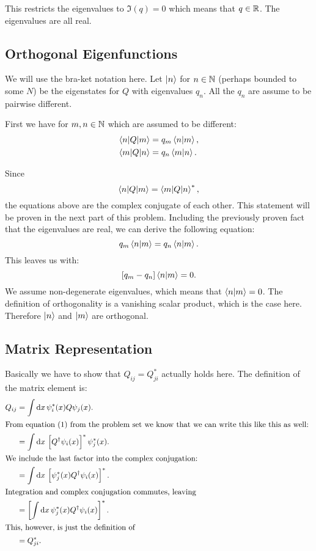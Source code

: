 \documentclass[11pt, ngerman, fleqn, DIV=15, headinclude, BCOR=1cm]{scrartcl}
\begin{document}
This restricts the eigenvalues to $\Im(q) = 0$ which means that $q \in \mathbb R$. The
eigenvalues are all real.

\subsection{Orthogonal Eigenfunctions}

We will use the bra-ket notation here. Let $\ket n$ for $n \in \mathbb N$ (perhaps
bounded to some $N$) be the eigenstates for $Q$ with eigenvalues $q_n$. All the
$q_n$ are assume to be pairwise different.

First we have for $m, n \in \mathbb N$ which are assumed to be different:
\begin{align*}
    \braket{n | Q | m} &= q_m \braket{n | m}, \\
    \braket{m | Q | n} &= q_n \braket{m | n}.
\end{align*}

Since
\[
    \braket{n | Q | m} = \braket{m | Q | n}^*,
\]
the equations above are the complex conjugate of each other. This statement
will be proven in the next part of this problem. Including the previously
proven fact that the eigenvalues are real, we can derive the following
equation:
\[
    q_m \braket{n|m} = q_n \braket{n|m}.
\]
This leaves us with:
\[
    [q_m - q_n] \braket{n|m} = 0.
\]
We assume non-degenerate eigenvalues, which means that $\braket{n|m} = 0$. The
definition of orthogonality is a vanishing scalar product, which is the case
here. Therefore $\ket n$ and $\ket m$ are orthogonal.

\subsection{Matrix Representation}

Basically we have to show that $Q_{ij} = Q_{ji}^*$ actually holds here. The
definition of the matrix element is:
\begin{align*}
    Q_{ij}
    &= \int \dif x \, \psi_i^*(x) Q \psi_j(x). \\
    \intertext{%
        From equation~(1) from the problem set we know that we can write this
        like this as well:
    }
    &= \int \dif x \, \sbr{Q^\dagger \psi_i(x)}^* \psi_j^*(x). \\
    \intertext{%
        We include the last factor into the complex conjugation:
    }
    &= \int \dif x \, \sbr{\psi_j^*(x) Q^\dagger \psi_i(x)}^*. \\
    \intertext{%
        Integration and complex conjugation commutes, leaving
    }
    &= \sbr{ \int \dif x \, \psi_j^*(x) Q^\dagger \psi_i(x)}^*. \\
    \intertext{%
        This, however, is just the definition of
    }
    &= Q_{ji}^*.
\end{align*}
\end{document}
